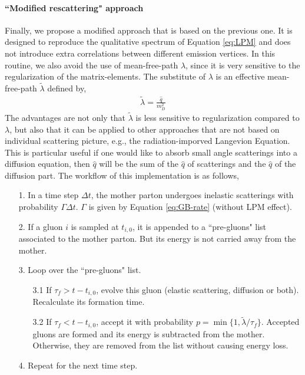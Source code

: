\documentclass[aps, prc, reprint, amsmath, groupedaddress, nofootinbib]{revtex4-1}
\begin{document}
\paragraph*{``Modified rescattering" approach} Finally, we propose a modified approach that is based on the previous one.
It is designed to reproduce the qualitative spectrum of Equation \ref{eq:LPM} and does not introduce extra correlations between different emission vertices. 
In this routine, we also avoid the use of mean-free-path $\lambda$, since it is very sensitive to the regularization of the matrix-elements. 
The substitute of $\lambda$ is an effective mean-free-path $\tilde{\lambda}$ defined by,
\begin{eqnarray}
\tilde{\lambda} = \frac{\hat{q}}{m_D^2}
\end{eqnarray}
The advantages are not only that $\tilde{\lambda}$ is less sensitive to regularization compared to $\lambda$, but also that it can be applied to other approaches that are not based on individual scattering picture, e.g., the radiation-imporved Langevion Equation.
This is particular useful if one would like to absorb small angle scatterings into a diffusion equation, then $\hat{q}$ will be the sum of the $\hat{q}$ of scatterings and the $\hat{q}$ of the diffusion part.
The workflow of this implementation is as follows,
\begin{itemize}
\item[1.] In a time step $\Delta t$, the mother parton undergoes inelastic scatterings with probability $\Gamma\Delta t$. $\Gamma$ is given by Equation \ref{eq:GB-rate} (without LPM effect).
\item[2.] If a gluon $i$ is sampled at $t_{i,0}$, it is appended to a ``pre-gluons" list associated to the mother parton. But its energy is not carried away from the mother.
\item[3.] Loop over the ``pre-gluons" list. 
\begin{itemize}
\item[3.1] If $\tau_f > t-t_{i,0}$, evolve this gluon (elastic scattering, diffusion or both). Recalculate its formation time.
\item[3.2] If $\tau_f < t-t_{i,0}$, accept it with probability $p = \min\{1, \tilde{\lambda}/\tau_f\}$. Accepted gluons are formed and its energy is subtracted from the mother. Otherwise, they are removed from the list without causing energy loss.
\end{itemize} 
\item[4.] Repeat for the next time step.
\end{itemize}
\end{document}
